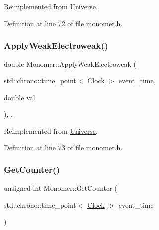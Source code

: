 Reimplemented from \mbox{\hyperlink{class_universe_a6d1226b3adec3c42a833afdbb6a65a92}{Universe}}.



Definition at line 72 of file monomer.\+h.

\mbox{\label{class_monomer_a64f65c128ebc2428c42739c930696ea1}} 
\subsubsection{\texorpdfstring{Apply\+Weak\+Electroweak()}{ApplyWeakElectroweak()}}
{\footnotesize\ttfamily double Monomer\+::\+Apply\+Weak\+Electroweak (\begin{DoxyParamCaption}\item[{std\+::chrono\+::time\+\_\+point$<$ \mbox{\hyperlink{universe_8h_a0ef8d951d1ca5ab3cfaf7ab4c7a6fd80}{Clock}} $>$}]{event\+\_\+time,  }\item[{double}]{val }\end{DoxyParamCaption})\hspace{0.3cm}{\ttfamily [inline]}, {\ttfamily [final]}, {\ttfamily [virtual]}}



Reimplemented from \mbox{\hyperlink{class_universe_a46a906baabb63e5d31f8b48ea1fae52e}{Universe}}.



Definition at line 73 of file monomer.\+h.

\mbox{\label{class_monomer_a4651a4bd0a41d0698821421043e41126}} 
\subsubsection{\texorpdfstring{Get\+Counter()}{GetCounter()}}
{\footnotesize\ttfamily unsigned int Monomer\+::\+Get\+Counter (\begin{DoxyParamCaption}\item[{std\+::chrono\+::time\+\_\+point$<$ \mbox{\hyperlink{universe_8h_a0ef8d951d1ca5ab3cfaf7ab4c7a6fd80}{Clock}} $>$}]{event\+\_\+time }\end{DoxyParamCaption})}



